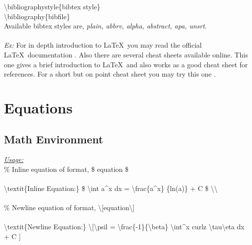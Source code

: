 \documentclass[12pt, twocolumn]{article}
\begin{document}
  \noindent \hspace*{6mm} \textbackslash bibliographystyle\{bibtex style\} \\
  \hspace*{6mm} \textbackslash bibliography\{bibfile\} \\
  
 \noindent Available bibtex styles are, \textit{plain, abbrv, alpha, abstract, apa, unsrt}. \\ \\
 
 
 \noindent \textit{Ex:} For in depth introduction to \LaTeX\ you may read the official \LaTeX\ documentation \cite{latexdocumentation}.
\noindent Also there are several cheat sheets available online. This one \cite{freedman2013} gives a brief introduction to \LaTeX\ and also works as a good cheat sheet for references. For a short but on point cheat sheet you may try this one \cite{chang2014}.

 \section{Equations}
 
 \subsection{Math Environment}
 
  \noindent \underline{\textit{Usage:}} \\
 
 \noindent \% Inline equation of format, \$ equation \$ \\ \\
 \noindent \textbackslash textit\{Inline Equation:\} \$ \textbackslash int a\textasciicircum x dx = \textbackslash frac\{a\textasciicircum x\} \{ln(a)\} + C \$ \textbackslash \textbackslash  \\ \\
 \noindent \% Newline equation of format, \textbackslash [equation\textbackslash] \\ \\
 \textbackslash textit\{Newline Equation:\} \textbackslash [\textbackslash psi\textunderscore l = \textbackslash frac\{-1\}\{\textbackslash beta\} \textbackslash int\textasciicircum x curl\textunderscore z \textbackslash tau\textunderscore \textbackslash eta dx + C ]
 
 \begin{center}
  \big\Downarrow
 \end{center}
\end{document}
